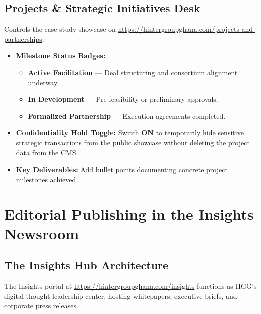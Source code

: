 \documentclass[11pt,a4paper,oneside]{book}
\begin{document}
\section{Projects \& Strategic Initiatives Desk}
Controls the case study showcase on \url{https://hintergroupghana.com/projects-and-partnerships}.
\begin{itemize}
  \item \textbf{Milestone Status Badges:}
    \begin{itemize}
      \item \textcolor{HGGGold}{\textbf{Active Facilitation}} — Deal structuring and consortium alignment underway.
      \item \textcolor{HGGAccentBlue}{\textbf{In Development}} — Pre-feasibility or preliminary approvals.
      \item \textcolor{HGGGreen}{\textbf{Formalized Partnership}} — Execution agreements completed.
    \end{itemize}
  \item \textbf{Confidentiality Hold Toggle:} Switch \textbf{ON} to temporarily hide sensitive strategic transactions from the public showcase without deleting the project data from the CMS.
  \item \textbf{Key Deliverables:} Add bullet points documenting concrete project milestones achieved.
\end{itemize}

\chapter{Editorial Publishing in the Insights Newsroom}
\label{chap:insights}

\section{The Insights Hub Architecture}
The Insights portal at \url{https://hintergroupghana.com/insights} functions as HGG's digital thought leadership center, hosting whitepapers, executive briefs, and corporate press releases.
\end{document}

